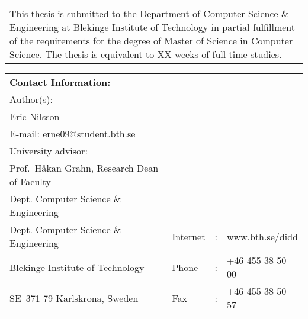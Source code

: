 {\pagestyle{empty}
\changepage{5cm}{1cm}{-0.5cm}{-0.5cm}{}{-2cm}{}{}{}
\noindent%
\begin{tabular}{p{\textwidth}}
{\small This thesis is submitted to the Department of Computer Science \& Engineering at Blekinge
Institute of Technology in partial fulfillment of the requirements for the degree of Master
of Science in Computer Science. The thesis is equivalent to XX weeks of
full-time studies.} %
\end{tabular}

\par\vspace {12cm}

\noindent%
\begin{tabular}{p{}lcl}
\textbf{Contact Information:}\\
Author(s):\\
Eric Nilsson\\
E-mail: \href{mailto:erne09@student.bth.se}{erne09@student.bth.se} \\ %
\par\vspace {5cm}
University advisor:\\
Prof.\ Håkan Grahn, Research Dean of Faculty\\
Dept. Computer Science \& Engineering

\par\vspace {1cm}

\noindent%
 \\
Dept. Computer Science \& Engineering & Internet & : & \href{http://www.bth.se/didd}{www.bth.se/didd}\\
Blekinge Institute of Technology & Phone	& : & +46 455 38 50 00 \\
SE--371 79 Karlskrona, Sweden & Fax & : & +46 455 38 50 57 \\
\end{tabular}
\clearpage
} %

\setcounter{page}{1}
